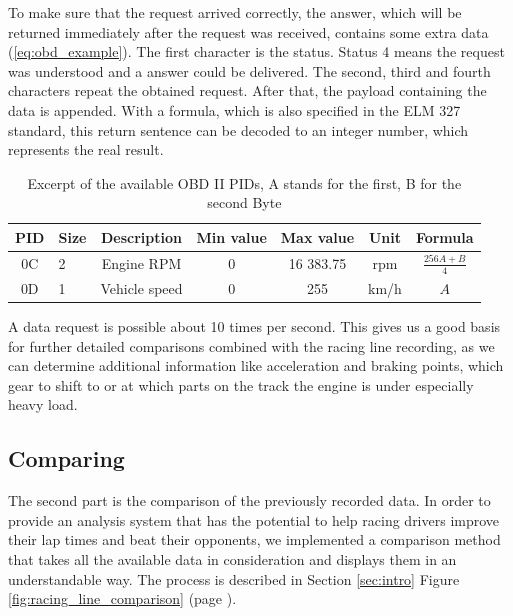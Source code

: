 To make sure that the request arrived correctly, the answer, which will be returned immediately after the request was received, contains some extra data (\ref{eq:obd_example}). The first character is the status. Status 4 means the request was understood and a answer could be delivered. The second, third and fourth characters repeat the obtained request. After that, the payload containing the data is appended. With a formula, which is also specified in the ELM 327 standard, this return sentence can be decoded to an integer number, which represents the real result.

\begin{table}[!ht]
	\begin{center}
		\begin{tabularx}{\textwidth}{|c | X | c | c | c | c | c |}
			\hline
			PID & Size & Description & Min value & Max value & Unit & Formula\\ \hline
			0C & 2 & Engine RPM & 0 & 16 383.75 & rpm & $\frac{256A + B}{4}$\\ \hline
			0D & 1 & Vehicle speed & 0 & 255 & km/h & $A$\\ \hline
		\end{tabularx}
	\end{center}
	\caption{Excerpt of the available OBD II PIDs, A stands for the first, B for the second Byte}
\end{table}

A data request is possible about 10 times per second. This gives us a good basis for further detailed comparisons combined with the racing line recording, as we can determine additional information like acceleration and braking points, which gear to shift to or at which parts on the track the engine is under especially heavy load.

\subsection{Comparing}
\label{sec:comparing}
The second part is the comparison of the previously recorded data. In order to provide an analysis system that has the potential to help racing drivers improve their lap times and beat their opponents, we implemented a comparison method that takes all the available data in consideration and displays them in an understandable way. The process is described in Section \ref{sec:intro} Figure \ref{fig:racing_line_comparison} (page \pageref{fig:racing_line_comparison}).

